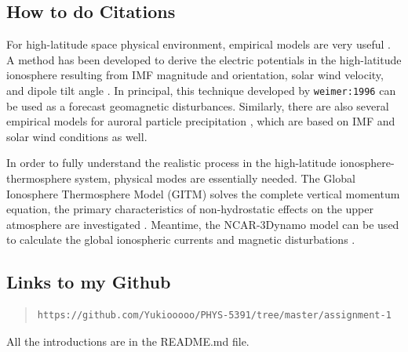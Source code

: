 \documentclass[12pt, letterpaper]{article} %
\begin{document}
\subsection{How to do Citations} %
For high-latitude space physical environment, empirical models are very useful  
\citet{weimer:1996}. A method has been developed to derive the electric potentials 
in the high-latitude ionosphere resulting from IMF magnitude and orientation, solar 
wind velocity, and dipole tilt angle \citep[chap. 2]{weimer:1996}. In principal, this 
technique developed by {\tt weimer:1996} can be used as a forecast geomagnetic 
disturbances. Similarly, there are also several empirical models for auroral particle 
precipitation \cite[]{hardy:1989,Fuller-Rowell1987}, which are based on IMF and 
solar wind conditions as well. 

In order to fully understand the realistic process in the high-latitude ionosphere-
thermosphere system, physical modes are essentially needed. The Global Ionosphere 
Thermosphere Model (GITM) solves the complete vertical momentum equation, the 
primary characteristics of non-hydrostatic effects on the upper atmosphere are 
investigated \cite[p. 13]{Deng2008}. Meantime, the NCAR-3Dynamo model can 
be used to calculate the global ionospheric currents and magnetic disturbations 
\citep[see][chap. 5]{Maute2017}.



\subsection{Links to my Github} %

\begin{quote} 
\begin{verbatim}
https://github.com/Yukiooooo/PHYS-5391/tree/master/assignment-1
\end{verbatim} %
\end{quote} %

All the introductions are in the README.md file. 





\clearpage %

\end{document}
